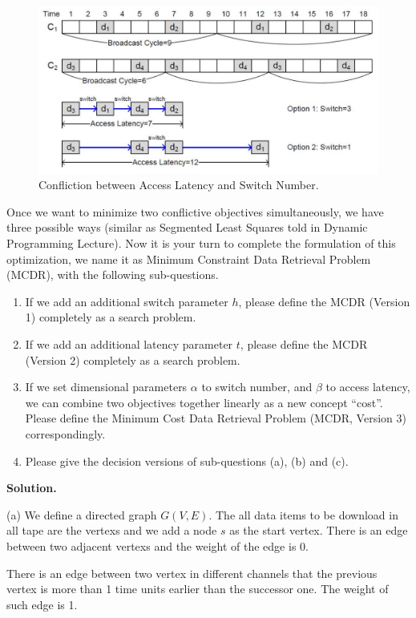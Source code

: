 \documentclass[12pt,a4paper]{article}
\theoremstyle{definition}
\begin{document}
\begin{enumerate}
\begin{figure}[!htbp]
	\centering
	\includegraphics[scale= 0.5]{Fig-Conflict.pdf}
	\caption{Confliction between Access Latency and Switch Number.} \label{Fig-Conflict}
\end{figure}

Once we want to minimize two conflictive objectives simultaneously, we have three possible ways (similar as Segmented Least Squares told in Dynamic Programming Lecture). Now it is your turn to complete the formulation of this optimization, we name it as Minimum Constraint Data Retrieval Problem (MCDR), with the following sub-questions.
\begin{enumerate}
	\item If we add an additional switch parameter $h$, please define the MCDR (Version 1) completely as a search problem.
	\item If we add an additional latency parameter $t$, please define the MCDR (Version 2) completely as a search problem.
	\item If we set dimensional parameters $\alpha$ to switch number, and $\beta$ to access latency, we can combine two objectives together linearly as a new concept ``cost''. Please define the Minimum Cost Data Retrieval Problem (MCDR, Version 3) correspondingly.
	\item Please give the decision versions of sub-questions (a), (b) and (c).
\end{enumerate}
\textbf{Solution.}

(a) We define a directed graph $G(V,E)$. The all data items to be download in all tape are the vertexs and we add a node $s$ as the start vertex. There is an edge between two adjacent vertexs and  the weight of the edge is 0.

There is an edge between two vertex in different channels that the previous vertex is more than 1 time units earlier than the successor one. The weight of such edge is 1.


\end{enumerate}
\end{document}
